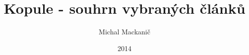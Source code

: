 \documentclass[a4paper]{book}
\begin{document}
\newtheorem{definition}{Definice}[chapter]
\newtheorem{theorem}{Věta}[chapter]
\newtheorem{proof}{Důkaz}[chapter]
\newtheorem{example}{Příklad}[chapter]
\newtheorem{proposition}{Tvrzení}[chapter]
\newtheorem{corollary}{Tvrzení}[chapter]
\newtheorem{fallacy}{Omyl}[chapter]


\title{Kopule - souhrn vybraných článků}
\author{Michal Mackanič}
\date{2014}
\maketitle

\tableofcontents





\end{document}
